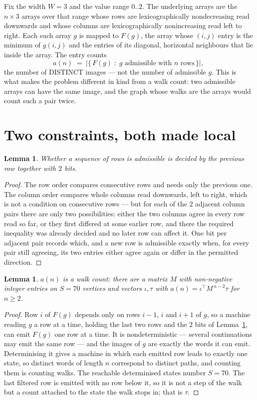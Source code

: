 \documentclass[11pt,a4paper]{article}
\theoremstyle{plain}
\newtheorem{lemma}[theorem]{Lemma}
\theoremstyle{definition}
\begin{document}
Fix the width $W=3$ and the value range $0..2$. The underlying arrays are the
$n\times3$ arrays over that range whose rows are lexicographically nondecreasing read downwards
and whose columns are lexicographically nonincreasing read left to right. Each such array $g$
is mapped to $F(g)$, the array whose $(i,j)$ entry is the minimum of $g(i,j)$ and the entries
of its diagonal, horizontal neighbours that lie inside the array. The entry counts
\[
a(n)\;=\;\bigl|\{\,F(g)\;:\;g\text{ admissible with }n\text{ rows}\,\}\bigr|,
\]
the number of DISTINCT images --- not the number of admissible $g$. This is what makes the
problem different in kind from a walk count: two admissible arrays can have the same image, and
the graph whose walks are the arrays would count such a pair twice.

\section{Two constraints, both made local}

\begin{lemma}\label{lem:local}
Whether a sequence of rows is admissible is decided by the previous row together with
$2$ bits.
\end{lemma}

\begin{proof}
The row order compares consecutive rows and needs only the previous one. The column order
compares whole columns read downwards, left to right, which is not a condition on consecutive
rows --- but for each of the $2$ adjacent column pairs there are only two possibilities:
either the two columns agree in every row read so far, or they first differed at some earlier
row, and there the required inequality was already decided and no later row can affect it. One
bit per adjacent pair records which, and a new row is admissible exactly when, for every pair
still agreeing, its two entries either agree again or differ in the permitted direction.
\end{proof}

\begin{lemma}\label{lem:det}
$a(n)$ is a walk count: there are a matrix $M$ with non-negative integer entries on $S=70$
vertices and vectors $\iota,\tau$ with $a(n)=\iota^{\!\top}M^{\,n-2}\tau$ for $n\ge2$.
\end{lemma}

\begin{proof}
Row $i$ of $F(g)$ depends only on rows $i-1$, $i$ and $i+1$ of $g$, so a machine reading $g$ a
row at a time, holding the last two rows and the $2$ bits of Lemma~\ref{lem:local}, can
emit $F(g)$ one row at a time. It is nondeterministic --- several continuations may emit the
same row --- and the images of $g$ are exactly the words it can emit. Determinising it gives a
machine in which each emitted row leads to exactly one state, so distinct words of length $n$
correspond to distinct paths, and counting them is counting walks. The reachable determinised
states number $S=70$. The last filtered row is emitted with no row below it, so it is not a
step of the walk but a count attached to the state the walk stops in; that is $\tau$.
\end{proof}
\end{document}
